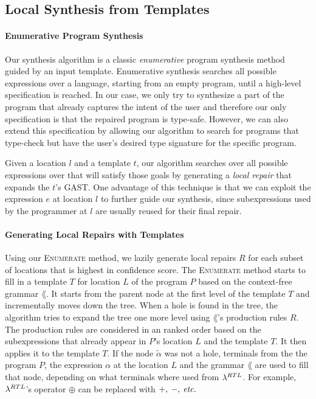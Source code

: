 \subsection{Local Synthesis from Templates}
\label{subsec:local-synthesis}

\paragraph{Enumerative Program Synthesis}
Our synthesis algorithm is a classic \emph{enumerative} program synthesis method
guided by an input template. Enumerative synthesis searches all possible
expressions over a language, starting from an empty program, until a high-level
specification is reached. In our case, we only try to synthesize a part of the
program that already captures the intent of the user and therefore our only
specification is that the repaired program is type-safe. However, we can also
extend this specification by allowing our algorithm to search for programs that
type-check but have the user's desired type signature for the specific program.

Given a location $l$ and a template $t$, our algorithm searches over all
possible expressions over \lang that will satisfy those goals by generating a
\emph{local repair} that expands the $t$'s GAST. One advantage of this technique
is that we can exploit the expression $e$ at location $l$ to further guide our
synthesis, since subexpressions used by the programmer at $l$ are usually reused
for their final repair.



\paragraph{Generating Local Repairs with Templates}
Using our \textsc{Enumerate} method, we lazily generate local repairs $R$ for
each subset of locations that is highest in confidence score. The
\textsc{Enumerate} method starts to fill in a template $T$ for location $L$ of
the program $P$ based on the context-free grammar $\lang$. It starts from the
parent node at the first level of the template $T$ and incrementally moves
down the tree. When a hole is found in the tree, the algorithm tries to expand
the tree one more level using $\lang$'s production rules $R$. The production
rules are considered in an ranked order based on the subexpressions that already
appear in $P$'s location $L$ and the template $T$. It then applies it to the
template $T$. If the node $\tilde{\alpha}$ was not a hole, terminals from the
the program $P$, the expression $\alpha$ at the location $L$ and the grammar
$\lang$ are used to fill that node, depending on what terminals where used from
$\lambda^{RTL}$. For example, $\lambda^{RTL}$'s operator $\oplus$ can be replaced
with $+,\:-,\:\textit{etc.}$

